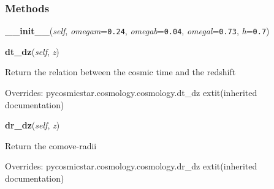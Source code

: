 
  \subsubsection{Methods}

    \label{pycosmicstar:lcdmcosmology:lcdmcosmology:__init__}

    \vspace{0.5ex}

\hspace{.8\funcindent}\begin{boxedminipage}{\funcwidth}

    \raggedright \textbf{\_\_init\_\_}(\textit{self}, \textit{omegam}={\tt 0.24}, \textit{omegab}={\tt 0.04}, \textit{omegal}={\tt 0.73}, \textit{h}={\tt 0.7})

\setlength{\parskip}{2ex}
\setlength{\parskip}{1ex}
    \end{boxedminipage}

    \vspace{0.5ex}

\hspace{.8\funcindent}\begin{boxedminipage}{\funcwidth}

    \raggedright \textbf{dt\_dz}(\textit{self}, \textit{z})

\setlength{\parskip}{2ex}
    Return the relation between the cosmic time and the redshift

\setlength{\parskip}{1ex}
      Overrides: pycosmicstar.cosmology.cosmology.dt\_dz 	extit{(inherited documentation)}

    \end{boxedminipage}

    \vspace{0.5ex}

\hspace{.8\funcindent}\begin{boxedminipage}{\funcwidth}

    \raggedright \textbf{dr\_dz}(\textit{self}, \textit{z})

\setlength{\parskip}{2ex}
    Return the comove-radii

\setlength{\parskip}{1ex}
      Overrides: pycosmicstar.cosmology.cosmology.dr\_dz 	extit{(inherited documentation)}

    \end{boxedminipage}

